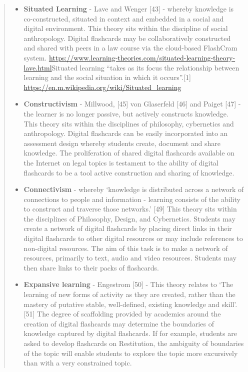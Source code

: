 \begin{quote}
\begin{itemize}
\tightlist
\item
  \textbf{Situated Learning} - Lave and Wenger {[}43{]} - whereby
  knowledge is co-constructed, situated in context and embedded in a
  social and digital environment. This theory sits within the discipline
  of social anthropology. Digital flashcards may be collaboratively
  constructed and shared with peers in a law course via the cloud-based
  FlashCram system.
  \url{https://www.learning-theories.com/situated-learning-theory-lave.html}Situated
  learning ``takes as its focus the relationship between learning and
  the social situation in which it occurs''.{[}1{]}
  \url{https://en.m.wikipedia.org/wiki/Situated_learning}
\item
  \textbf{Constructivism} - Millwood, {[}45{]} von Glaserfeld {[}46{]}
  and Paiget {[}47{]} - the learner is no longer passive, but actively
  constructs knowledge. This theory sits within the disciplines of
  philosophy, cybernetics and anthropology. Digital flashcards can be
  easily incorporated into an assessment design whereby students create,
  document and share knowledge. The proliferation of shared digital
  flashcards available on the Internet on legal topics is testament to
  the ability of digital flashcards to be a tool active construction and
  sharing of knowledge.
\item
  \textbf{Connectivism} - whereby `knowledge is distributed across a
  network of connections to people and information - learning consists
  of the ability to construct and traverse those networks.' {[}49{]}
  This theory sits within the disciplines of Philosophy, Design, and
  Cybernetics. Students may create a network of digital flashcards by
  placing direct links in their digital flashcards to other digital
  resources or may include references to non-digital resources. The aim
  of this task is to make a network of resources, primarily to text,
  audio and video resources. Students may then share links to their
  packs of flashcards.
\item
  \textbf{Expansive learning} - Engestrom {[}50{]} - This theory relates
  to `The learning of new forms of activity as they are created, rather
  than the mastery of putative stable, well-defined, existing knowledge
  and skill'. {[}51{]} The degree of scaffolding provided by academics
  around the creation of digital flashcards may determine the boundaries
  of knowledge captured by digital flashcards. If for example, students
  are asked to develop flashcards on Restitution, the ambiguity of
  boundaries of the topic will enable students to explore the topic more
  excursively than with a very constrained topic.
\end{itemize}


\end{quote}
